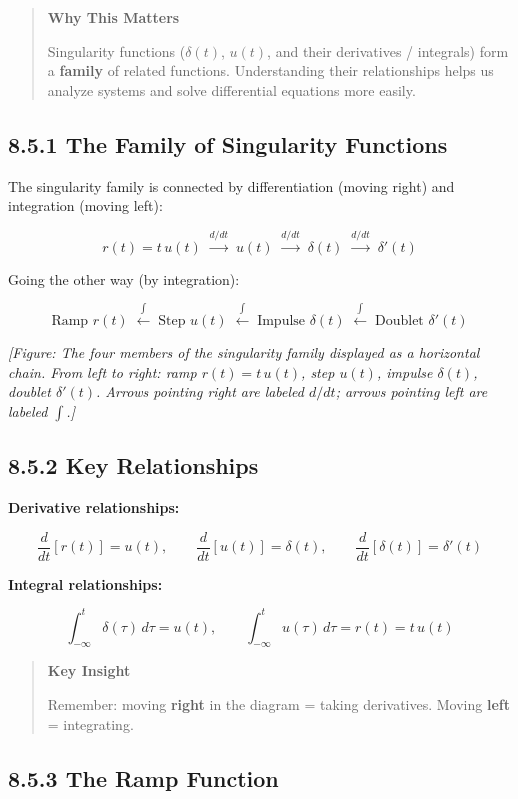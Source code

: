 \documentclass[11pt]{article}
\begin{document}
\begin{quote}
\textbf{Why This Matters}

Singularity functions ($\delta(t)$, $u(t)$, and their derivatives / integrals) form a \textbf{family} of related functions. Understanding their relationships helps us analyze systems and solve differential equations more easily.
\end{quote}

\subsection*{8.5.1 The Family of Singularity Functions}

The singularity family is connected by differentiation (moving right) and integration (moving left):

\[r(t) = t\,u(t) \;\xrightarrow{d/dt}\; u(t) \;\xrightarrow{d/dt}\; \delta(t) \;\xrightarrow{d/dt}\; \delta'(t)\]

Going the other way (by integration):

\[\text{Ramp } r(t) \;\xleftarrow{\int}\; \text{Step } u(t) \;\xleftarrow{\int}\; \text{Impulse } \delta(t) \;\xleftarrow{\int}\; \text{Doublet } \delta'(t)\]

\textit{[Figure: The four members of the singularity family displayed as a horizontal chain. From left to right: ramp $r(t) = t\,u(t)$, step $u(t)$, impulse $\delta(t)$, doublet $\delta'(t)$. Arrows pointing right are labeled $d/dt$; arrows pointing left are labeled $\int$.]}

\subsection*{8.5.2 Key Relationships}

\textbf{Derivative relationships:}

\[\frac{d}{dt}[r(t)] = u(t),\qquad \frac{d}{dt}[u(t)] = \delta(t),\qquad \frac{d}{dt}[\delta(t)] = \delta'(t)\]

\textbf{Integral relationships:}

\[\int_{-\infty}^{t}\delta(\tau)\,d\tau = u(t),\qquad \int_{-\infty}^{t}u(\tau)\,d\tau = r(t) = t\,u(t)\]

\begin{quote}
\textbf{Key Insight}

Remember: moving \textbf{right} in the diagram = taking derivatives. Moving \textbf{left} = integrating.
\end{quote}

\subsection*{8.5.3 The Ramp Function}
\end{document}
